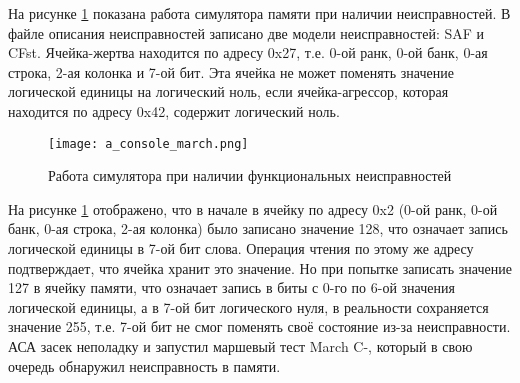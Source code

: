 На рисунке \ref{fig:usage:console_march} показана работа симулятора памяти при наличии неисправностей. В файле описания неисправностей записано две модели неисправностей: SAF и CFst. Ячейка-жертва находится по адресу 0x27, т.е. 0-ой ранк, 0-ой банк, 0-ая строка, 2-ая колонка и 7-ой бит. Эта ячейка не может поменять значение логической единицы на логический ноль, если ячейка-агрессор, которая находится по адресу 0x42, содержит логический ноль. 

\begin{figure}[ht]
\centering
  \texttt{[image: a\_console\_march.png]}  
  \caption{Работа симулятора при наличии функциональных неисправностей}
  \label{fig:usage:console_march}
\end{figure}

На рисунке \ref{fig:usage:console_march} отображено, что в начале в ячейку по адресу 0x2 (0-ой ранк, 0-ой банк, 0-ая строка, 2-ая колонка) было записано значение 128, что означает запись логической единицы в 7-ой бит слова. Операция чтения по этому же адресу подтверждает, что ячейка хранит это значение. Но при попытке записать значение 127 в ячейку памяти, что означает запись в биты с 0-го по 6-ой значения логической единицы, а в 7-ой бит логического нуля, в реальности сохраняется значение 255, т.е. 7-ой бит не смог поменять своё состояние из-за неисправности. АСА засек неполадку и запустил маршевый тест March C-, который в свою очередь обнаружил неисправность в памяти.